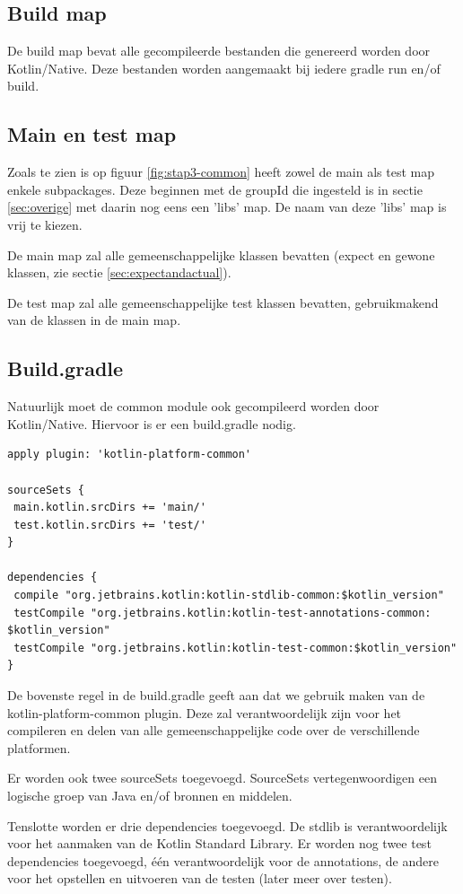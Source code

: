 \subsection{Build map}
De build map bevat alle gecompileerde bestanden die genereerd worden door Kotlin/Native. Deze bestanden worden aangemaakt bij iedere gradle run en/of build.

\subsection{Main en test map}
\label{sec:maintestcommon}
Zoals te zien is op figuur \ref{fig:stap3-common} heeft zowel de main als test map enkele subpackages. Deze beginnen met de groupId die ingesteld is in sectie \ref{sec:overige} met daarin nog eens een 'libs' map. De naam van deze 'libs' map is vrij te kiezen.

De main map zal alle gemeenschappelijke klassen bevatten (expect en gewone klassen, zie sectie \ref{sec:expectandactual}).

De test map zal alle gemeenschappelijke test klassen bevatten, gebruikmakend van de klassen in de main map.

\subsection{Build.gradle}
Natuurlijk moet de common module ook gecompileerd worden door Kotlin/Native. Hiervoor is er een build.gradle nodig.

\begin{lstlisting}
apply plugin: 'kotlin-platform-common'

sourceSets {
 main.kotlin.srcDirs += 'main/'
 test.kotlin.srcDirs += 'test/'
}

dependencies {
 compile "org.jetbrains.kotlin:kotlin-stdlib-common:$kotlin_version"
 testCompile "org.jetbrains.kotlin:kotlin-test-annotations-common: $kotlin_version"
 testCompile "org.jetbrains.kotlin:kotlin-test-common:$kotlin_version"
}
\end{lstlisting}
De bovenste regel in de build.gradle geeft aan dat we gebruik maken van de kotlin-platform-common plugin. Deze zal verantwoordelijk zijn voor het compileren en delen van alle gemeenschappelijke code over de verschillende platformen.

Er worden ook twee sourceSets toegevoegd. SourceSets vertegenwoordigen een logische groep van Java en/of bronnen en middelen.

Tenslotte worden er drie dependencies toegevoegd. De stdlib is verantwoordelijk voor het aanmaken van de Kotlin Standard Library. Er worden nog twee test dependencies toegevoegd, één verantwoordelijk voor de annotations, de andere voor het opstellen en uitvoeren van de testen (later meer over testen).

